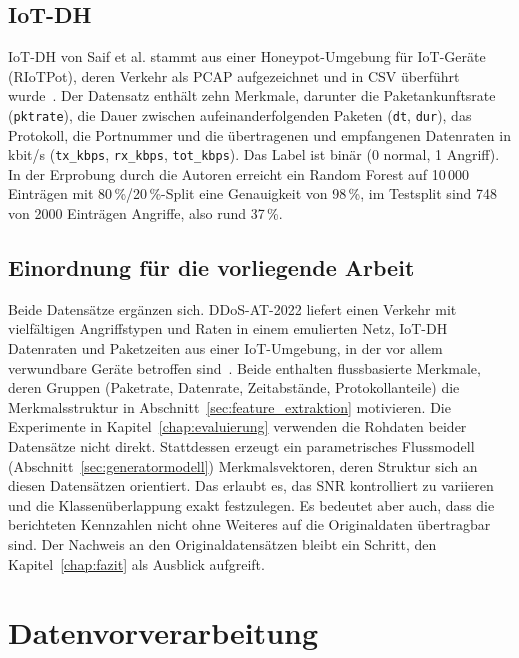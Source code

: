 \subsection*{\mbox{IoT-DH}}

\mbox{IoT-DH} von Saif et al. stammt aus einer Honeypot-Umgebung für IoT-Geräte (RIoTPot), deren Verkehr als PCAP aufgezeichnet und in CSV überführt wurde~\autocite{saifIoTDHDatasetClassification2024}. Der Datensatz enthält zehn Merkmale, darunter die Paketankunftsrate (\texttt{pktrate}), die Dauer zwischen aufeinanderfolgenden Paketen (\texttt{dt}, \texttt{dur}), das Protokoll, die Portnummer und die übertragenen und empfangenen Datenraten in kbit/s (\texttt{tx\_kbps}, \texttt{rx\_kbps}, \texttt{tot\_kbps}). Das Label ist binär (0 normal, 1 Angriff). In der Erprobung durch die Autoren erreicht ein Random Forest auf 10\,000 Einträgen mit 80\,\%/20\,\%-Split eine Genauigkeit von 98\,\%, im Testsplit sind 748 von 2000 Einträgen Angriffe, also rund 37\,\%.

\subsection*{Einordnung für die vorliegende Arbeit}

Beide Datensätze ergänzen sich. \mbox{DDoS-AT-2022} liefert einen Verkehr mit vielfältigen Angriffstypen und Raten in einem emulierten Netz, \mbox{IoT-DH} Datenraten und Paketzeiten aus einer IoT-Umgebung, in der vor allem verwundbare Geräte betroffen sind~\autocite{balaAITechniquesIoTbased2024}. Beide enthalten flussbasierte Merkmale, deren Gruppen (Paketrate, Datenrate, Zeitabstände, Protokollanteile) die Merkmalsstruktur in Abschnitt~\ref{sec:feature_extraktion} motivieren. Die Experimente in Kapitel~\ref{chap:evaluierung} verwenden die Rohdaten beider Datensätze nicht direkt. Stattdessen erzeugt ein parametrisches Flussmodell (Abschnitt~\ref{sec:generatormodell}) Merkmalsvektoren, deren Struktur sich an diesen Datensätzen orientiert. Das erlaubt es, das SNR kontrolliert zu variieren und die Klassenüberlappung exakt festzulegen. Es bedeutet aber auch, dass die berichteten Kennzahlen nicht ohne Weiteres auf die Originaldaten übertragbar sind. Der Nachweis an den Originaldatensätzen bleibt ein Schritt, den Kapitel~\ref{chap:fazit} als Ausblick aufgreift.

\section{Datenvorverarbeitung}
\label{sec:datenvorverarbeitung}

